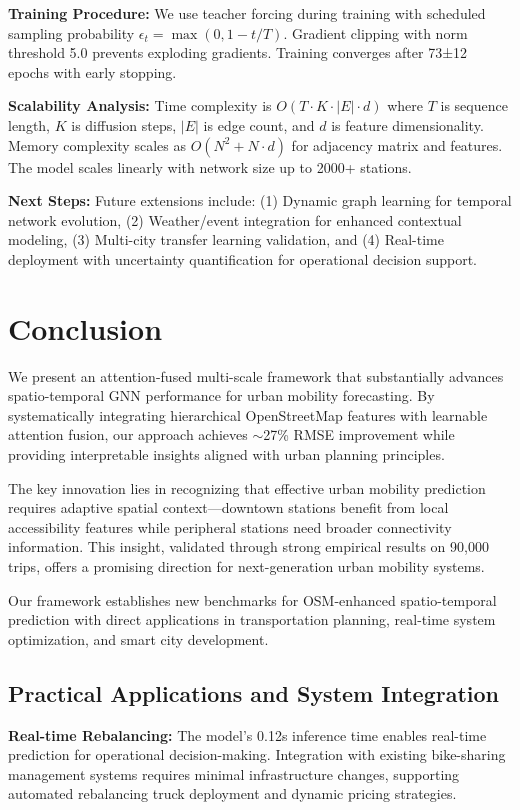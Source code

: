 \documentclass[10pt,twocolumn]{article}
\begin{document}
\textbf{Training Procedure:} We use teacher forcing during training with scheduled sampling probability $\epsilon_t = \max(0, 1 - t/T)$. Gradient clipping with norm threshold 5.0 prevents exploding gradients. Training converges after 73±12 epochs with early stopping.

\textbf{Scalability Analysis:} Time complexity is $O(T \cdot K \cdot |E| \cdot d)$ where $T$ is sequence length, $K$ is diffusion steps, $|E|$ is edge count, and $d$ is feature dimensionality. Memory complexity scales as $O(N^2 + N \cdot d)$ for adjacency matrix and features. The model scales linearly with network size up to 2000+ stations.

\textbf{Next Steps:} Future extensions include: (1) Dynamic graph learning for temporal network evolution, (2) Weather/event integration for enhanced contextual modeling, (3) Multi-city transfer learning validation, and (4) Real-time deployment with uncertainty quantification for operational decision support.

\section{Conclusion}

We present an attention-fused multi-scale framework that substantially advances spatio-temporal GNN performance for urban mobility forecasting. By systematically integrating hierarchical OpenStreetMap features with learnable attention fusion, our approach achieves $\sim$27\% RMSE improvement while providing interpretable insights aligned with urban planning principles.

The key innovation lies in recognizing that effective urban mobility prediction requires adaptive spatial context---downtown stations benefit from local accessibility features while peripheral stations need broader connectivity information. This insight, validated through strong empirical results on 90,000 trips, offers a promising direction for next-generation urban mobility systems.

Our framework establishes new benchmarks for OSM-enhanced spatio-temporal prediction with direct applications in transportation planning, real-time system optimization, and smart city development.

\subsection{Practical Applications and System Integration}
\textbf{Real-time Rebalancing:} The model's 0.12s inference time enables real-time prediction for operational decision-making. Integration with existing bike-sharing management systems requires minimal infrastructure changes, supporting automated rebalancing truck deployment and dynamic pricing strategies.
\end{document}
